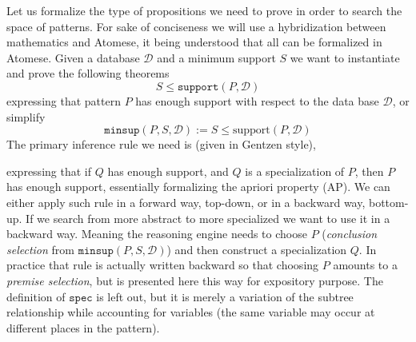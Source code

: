 \documentclass[runningheads]{llncs}
\begin{document}
Let us formalize the type of propositions we need to prove in order to
search the space of patterns. For sake of conciseness we will use a
hybridization between mathematics and Atomese, it being understood that
all can be formalized in Atomese.  Given a database $\mathcal{D}$ and
a minimum support $S$ we want to instantiate and prove the following
theorems
$$ S \le \texttt{support}(P, \mathcal{D}) $$ expressing that pattern
$P$ has enough support with respect to the data base $\mathcal{D}$, or
simplify
$$ \texttt{minsup}(P, S, \mathcal{D}) := S \le \text{support}(P,
\mathcal{D}) $$ The primary inference rule we need is (given in
Gentzen style),
\begin{prooftree}
\end{prooftree}
expressing that if $Q$ has enough support, and $Q$ is a specialization
of $P$, then $P$ has enough support, essentially formalizing the
apriori property (AP). We can either apply such rule in a forward way,
top-down, or in a backward way, bottom-up. If we search from more
abstract to more specialized we want to use it in a backward
way. Meaning the reasoning engine needs to choose $P$
(\emph{conclusion selection} from $\texttt{minsup}(P, S,
\mathcal{D})$) and then construct a specialization $Q$.  In practice
that rule is actually written backward so that choosing $P$ amounts to
a \emph{premise selection}, but is presented here this way for
expository purpose.  The definition of $\texttt{spec}$ is left out,
but it is merely a variation of the subtree relationship while
accounting for variables (the same variable may occur at different
places in the pattern).
\end{document}
